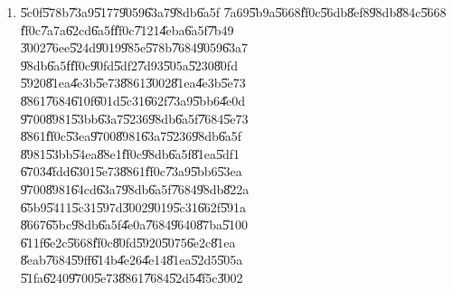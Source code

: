 \documentclass[12pt,a4paper]{article}
\begin{document}
\begin{enumerate}
\item \U{5c0f}\U{578b}\U{73a9}\U{5177}\U{9059}\U{63a7}\U{98db}\U{6a5f}%
\U{7a69}\U{5b9a}\U{5668}\U{ff0c}\U{56db}\U{8ef8}\U{98db}\U{884c}\U{5668}%
\U{ff0c}\U{7a7a}\U{62cd}\U{6a5f}\U{ff0c}\U{7121}\U{4eba}\U{6a5f}\U{7b49}%
\U{3002}\U{76ee}\U{524d}\U{9019}\U{985e}\U{578b}\U{7684}\U{9059}\U{63a7}%
\U{98db}\U{6a5f}\U{ff0c}\U{90fd}\U{5df2}\U{7d93}\U{505a}\U{5230}\U{80fd}%
\U{5920}\U{81ea}\U{4e3b}\U{5e73}\U{8861}\U{3002}\U{81ea}\U{4e3b}\U{5e73}%
\U{8861}\U{7684}\U{610f}\U{601d}\U{5c31}\U{662f}\U{73a9}\U{5bb6}\U{4e0d}%
\U{9700}\U{8981}\U{53bb}\U{63a7}\U{5236}\U{98db}\U{6a5f}\U{7684}\U{5e73}%
\U{8861}\U{ff0c}\U{53ea}\U{9700}\U{8981}\U{63a7}\U{5236}\U{98db}\U{6a5f}%
\U{8981}\U{53bb}\U{54ea}\U{88e1}\U{ff0c}\U{98db}\U{6a5f}\U{81ea}\U{5df1}%
\U{6703}\U{4fdd}\U{6301}\U{5e73}\U{8861}\U{ff0c}\U{73a9}\U{5bb6}\U{53ea}%
\U{9700}\U{8981}\U{64cd}\U{63a7}\U{98db}\U{6a5f}\U{7684}\U{98db}\U{822a}%
\U{65b9}\U{5411}\U{5c31}\U{597d}\U{3002}\U{9019}\U{5c31}\U{662f}\U{591a}%
\U{8667}\U{65bc}\U{98db}\U{6a5f}\U{4e0a}\U{7684}\U{9640}\U{87ba}\U{5100}%
\U{611f}\U{6e2c}\U{5668}\U{ff0c}\U{80fd}\U{5920}\U{5075}\U{6e2c}\U{81ea}%
\U{8eab}\U{7684}\U{59ff}\U{614b}\U{4e26}\U{4e14}\U{81ea}\U{52d5}\U{505a}%
\U{51fa}\U{6240}\U{9700}\U{5e73}\U{8861}\U{7684}\U{52d5}\U{4f5c}\U{3002}


\end{enumerate}
\end{document}
